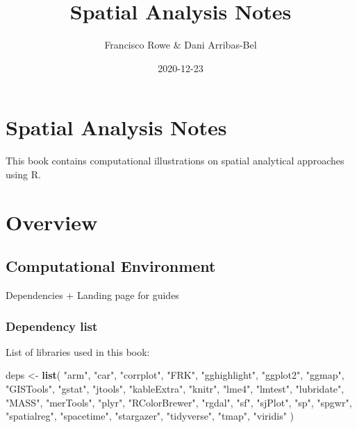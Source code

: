 \documentclass[
]{book}
\title{Spatial Analysis Notes}
\author{Francisco Rowe \& Dani Arribas-Bel}
\date{2020-12-23}
\newenvironment{Shaded}{\begin{snugshade}}{\end{snugshade}}
\newcommand{\KeywordTok}[1]{\textcolor[rgb]{0.13,0.29,0.53}{\textbf{#1}}}
\newcommand{\NormalTok}[1]{#1}
\newcommand{\StringTok}[1]{\textcolor[rgb]{0.31,0.60,0.02}{#1}}
\begin{document}
\maketitle

{
\setcounter{tocdepth}{1}
\tableofcontents
}
\hypertarget{spatial-analysis-notes}{%
\chapter{Spatial Analysis Notes}\label{spatial-analysis-notes}}

This book contains computational illustrations on spatial analytical approaches using R.

\hypertarget{overview}{%
\chapter{Overview}\label{overview}}

\hypertarget{computational-environment}{%
\section{Computational Environment}\label{computational-environment}}

Dependencies + Landing page for guides

\hypertarget{dependency-list}{%
\subsection{Dependency list}\label{dependency-list}}

List of libraries used in this book:

\begin{Shaded}
\begin{Highlighting}[]
\NormalTok{deps <-}\StringTok{ }\KeywordTok{list}\NormalTok{(}
    \StringTok{"arm"}\NormalTok{,}
    \StringTok{"car"}\NormalTok{,}
    \StringTok{"corrplot"}\NormalTok{,}
    \StringTok{"FRK"}\NormalTok{,}
    \StringTok{"gghighlight"}\NormalTok{,}
    \StringTok{"ggplot2"}\NormalTok{,}
    \StringTok{"ggmap"}\NormalTok{,}
    \StringTok{"GISTools"}\NormalTok{,}
    \StringTok{"gstat"}\NormalTok{,}
    \StringTok{"jtools"}\NormalTok{,}
    \StringTok{"kableExtra"}\NormalTok{,}
    \StringTok{"knitr"}\NormalTok{,}
    \StringTok{"lme4"}\NormalTok{,}
    \StringTok{"lmtest"}\NormalTok{,}
    \StringTok{"lubridate"}\NormalTok{,}
    \StringTok{"MASS"}\NormalTok{,}
    \StringTok{"merTools"}\NormalTok{,}
    \StringTok{"plyr"}\NormalTok{,}
    \StringTok{"RColorBrewer"}\NormalTok{,}
    \StringTok{"rgdal"}\NormalTok{,}
    \StringTok{"sf"}\NormalTok{,}
    \StringTok{"sjPlot"}\NormalTok{,}
    \StringTok{"sp"}\NormalTok{,}
    \StringTok{"spgwr"}\NormalTok{,}
    \StringTok{"spatialreg"}\NormalTok{,}
    \StringTok{"spacetime"}\NormalTok{,}
    \StringTok{"stargazer"}\NormalTok{,}
    \StringTok{"tidyverse"}\NormalTok{,}
    \StringTok{"tmap"}\NormalTok{,}
    \StringTok{"viridis"}
\NormalTok{)}
\end{Highlighting}
\end{Shaded}
\end{document}
